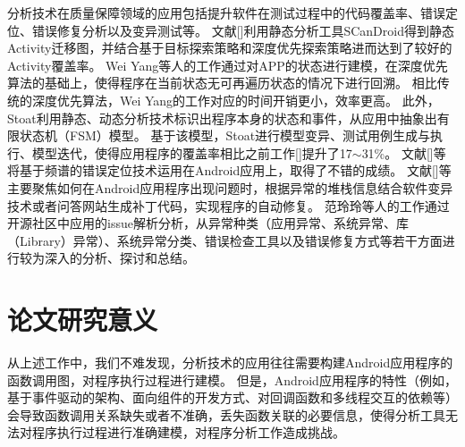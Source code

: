 
分析技术在质量保障领域的应用包括提升软件在测试过程中的代码覆盖率\cite{azim2013targeted,yang2013grey,su2016fsmdroid,androidtest2}、错误定位\cite{mirzaei2015exception,machado2013mzoltar}、错误修复分析\cite{tan2018repairing,QingGaoASE15}以及变异测试\cite{MutationOperatorsAndroid,deng2015towards,linares2017enabling}等。
文献[]利用静态分析工具SCanDroid得到静态Activity迁移图，并结合基于目标探索策略和深度优先探索策略进而达到了较好的Activity覆盖率。
Wei Yang等人的工作\cite{yang2013grey}通过对APP的状态进行建模，在深度优先算法的基础上，使得程序在当前状态无可再遍历状态的情况下进行回溯。
相比传统的深度优先算法，Wei Yang的工作对应的时间开销更小，效率更高。
此外，Stoat\cite{su2016fsmdroid,androidtest2}利用静态、动态分析技术标识出程序本身的状态和事件，从应用中抽象出有限状态机（FSM）模型。
基于该模型，Stoat进行模型变异、测试用例生成与执行、模型迭代，使得应用程序的覆盖率相比之前工作[]提升了17$\sim$31\%。
文献[]等将基于频谱的错误定位技术运用在Android应用上，取得了不错的成绩。
文献[]等主要聚焦如何在Android应用程序出现问题时，根据异常的堆栈信息结合软件变异技术或者问答网站生成补丁代码，实现程序的自动修复。
范玲玲等人的工作\cite{fan2018large}通过开源社区中应用的issue解析分析，从异常种类（应用异常、系统异常、库（Library）异常）、系统异常分类、错误检查工具以及错误修复方式等若干方面进行较为深入的分析、探讨和总结。






\section{论文研究意义}


从上述工作中，我们不难发现，分析技术的应用往往需要构建Android应用程序的函数调用图，对程序执行过程进行建模。
但是，Android应用程序的特性（例如，基于事件驱动的架构、面向组件的开发方式、对回调函数和多线程交互的依赖等）会导致函数调用关系缺失或者不准确，丢失函数关联的必要信息，使得分析工具无法对程序执行过程进行准确建模，对程序分析工作造成挑战。




